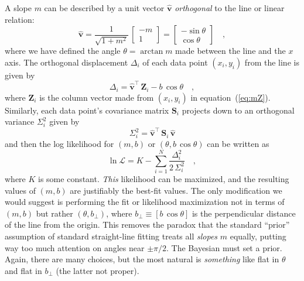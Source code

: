 \documentclass[12pt,twoside,pdftex]{article}
\newcommand{\equationname}{equation}
\newcommand{\mmatrix}[1]{\boldsymbol{#1}}
\newcommand{\transpose}[1]{{#1}^{\scriptscriptstyle \top}}
\newcommand{\mS}{\mmatrix{S}}
\newcommand{\mZ}{\mmatrix{Z}}
\newcommand{\vhat}{\mmatrix{\hat{v}}}
\newcommand{\like}{\mathscr{L}}
\newcommand{\bperp}{b_{\perp}}
\begin{document}
A slope $m$ can be described by a unit vector $\vhat$
\emph{orthogonal} to the line or linear relation:
\begin{equation}
\vhat
 = \frac{1}{\sqrt{1+m^2}}\,\left[\begin{array}{c}-m\\1\end{array}\right]
 = \left[\begin{array}{c}-\sin\theta\\\cos\theta\end{array}\right] \quad ,
\end{equation}
where we have defined the angle $\theta = \arctan m$ made between the
line and the $x$ axis.  The orthogonal displacement $\Delta_i$ of each
data point $(x_i,y_i)$ from the line is given by
\begin{equation}
\Delta_i = \transpose{\vhat}\,\mZ_i - b\,\cos\theta \quad ,
\end{equation}
where $\mZ_i$ is the column vector made from $(x_i,y_i)$ in
\equationname~(\ref{eq:mZ}).  Similarly, each data point's covariance
matrix $\mS_i$ projects down to an orthogonal variance $\Sigma_i^2$ given by
\begin{equation}\label{eq:Sigma}
\Sigma_i^2 = \transpose{\vhat}\,\mS_i\,\vhat
\end{equation}
and then the log likelihood for $(m,b)$ or $(\theta,b\,\cos\theta)$
can be written as
\begin{equation}\label{eq:twodlike}
\ln\like = K - \sum_{i=1}^N \frac{\Delta_i^2}{2\,\Sigma_{i}^2} \quad ,
\end{equation}
where $K$ is some constant.  \emph{This} likelihood can be maximized,
and the resulting values of $(m,b)$ are justifiably the best-fit
values.  The only modification we would suggest is performing the fit
or likelihood maximization not in terms of $(m,b)$ but rather
$(\theta,\bperp)$, where $\bperp\equiv[b\,\cos\theta]$ is the
perpendicular distance of the line from the origin.  This removes the
paradox that the standard ``prior'' assumption of standard
straight-line fitting treats all \emph{slopes} $m$ equally, putting
way too much attention on angles near $\pm\pi/2$.  The Bayesian must
set a prior.  Again, there are many choices, but the most natural
is \emph{something} like flat in $\theta$ and flat in $\bperp$ (the
latter not proper).
\end{document}
